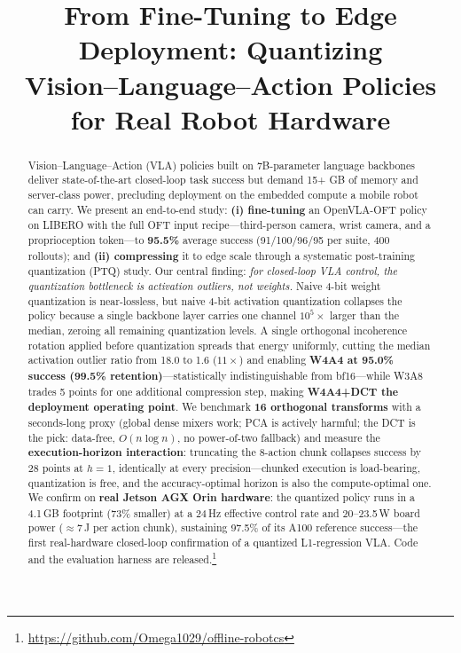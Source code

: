\documentclass[conference]{IEEEtran}
\title{From Fine-Tuning to Edge Deployment: Quantizing\\
Vision--Language--Action Policies for Real Robot Hardware}
\author{
\IEEEauthorblockN{Justin Williams, Kishor Datta Gupta, Roy George, Mrinmoy Sarkar}
\IEEEauthorblockA{Clark Atlanta University, Atlanta, GA 30314\\
Supported by the Air Force Research Laboratory (AFRL) and the Griffiss Institute\\
\texttt{justinwilliamstech693@gmail.com}}
}
\begin{document}
\maketitle

\begin{abstract}
Vision--Language--Action (VLA) policies built on 7B-parameter language backbones deliver
state-of-the-art closed-loop task success but demand 15+ GB of memory and server-class
power, precluding deployment on the embedded compute a mobile robot can carry.
We present an end-to-end study: \textbf{(i) fine-tuning} an OpenVLA-OFT policy on LIBERO
with the full OFT input recipe---third-person camera, wrist camera, and a proprioception
token---to \textbf{95.5\%} average success (91/100/96/95 per suite, 400 rollouts); and
\textbf{(ii) compressing} it to edge scale through a systematic post-training quantization
(PTQ) study.
Our central finding: \emph{for closed-loop VLA control, the quantization bottleneck is
activation outliers, not weights.}
Naive 4-bit weight quantization is near-lossless, but naive 4-bit activation quantization
collapses the policy because a single backbone layer carries one channel $10^5\times$
larger than the median, zeroing all remaining quantization levels. A single orthogonal
incoherence rotation applied before quantization spreads that energy uniformly, cutting
the median activation outlier ratio from 18.0 to 1.6 ($11\times$) and enabling
\textbf{W4A4 at 95.0\% success (99.5\% retention)}---statistically indistinguishable from
bf16---while W3A8 trades 5 points for one additional compression step, making
\textbf{W4A4+DCT the deployment operating point}.
We benchmark \textbf{16 orthogonal transforms} with a seconds-long proxy (global dense
mixers work; PCA is actively harmful; the DCT is the pick: data-free, $O(n\log n)$, no
power-of-two fallback) and measure the \textbf{execution-horizon interaction}: truncating
the 8-action chunk collapses success by 28 points at $h{=}1$, identically at every
precision---chunked execution is load-bearing, quantization is free, and the
accuracy-optimal horizon is also the compute-optimal one.
We confirm on \textbf{real Jetson AGX Orin hardware}: the quantized policy runs in a
4.1\,GB footprint (73\% smaller) at a 24\,Hz effective control rate and 20--23.5\,W
board power ($\approx$7\,J per action chunk), sustaining 97.5\% of its A100 reference
success---the first real-hardware closed-loop confirmation of a quantized L1-regression
VLA. Code and the evaluation harness are released.\footnote{\url{https://github.com/Omega1029/offline-robotcs}}
\end{abstract}
\end{document}
